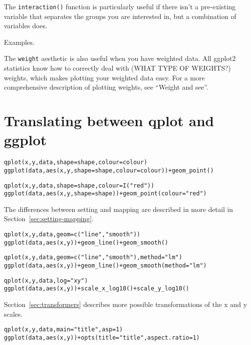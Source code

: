 The {\tt interaction()} function is particularly useful if there isn't a pre-existing variable that separates the groups you are interested in, but a combination of variables does.  

Examples.

The {\tt weight} aesthetic is also useful when you have weighted data.  All ggplot2 statistics know how to correctly deal with (WHAT TYPE OF WEIGHTS?) weights, which makes plotting your weighted data easy.  For a more comprehensive description of plotting weights, see ``Weight and see''.

\section{Translating between qplot and ggplot}
\label{sec:qplot-ggplot}


\begin{alltt}
qplot(x, y, data, shape=shape, colour = colour)
ggplot(data, aes(x, y, shape=shape, colour = colour)) + geom_point()
\end{alltt}

\begin{alltt}
qplot(x, y, data, shape=shape, colour = I("red"))
ggplot(data, aes(x, y, shape=shape)) + geom_point(colour="red")
\end{alltt}

The differences between setting and mapping are described in more detail in Section~\ref{sec:setting-mapping}.

\begin{alltt}
qplot(x, y, data, geom=c("line", "smooth"))
ggplot(data, aes(x, y)) + geom_line() + geom_smooth()
\end{alltt}

\begin{alltt}
qplot(x, y, data, geom=c("line", "smooth"), method="lm")
ggplot(data, aes(x, y)) + geom_line() + geom_smooth(method="lm")
\end{alltt}


\begin{alltt}
qplot(x, y, data, log="xy")
ggplot(data, aes(x, y)) + scale_x_log10() + scale_y_log10()
\end{alltt}

Section~\ref{sec:transformers} describes more possible transformations of the x and y scales.

\begin{alltt}
qplot(x, y, data, main="title", asp = 1)
ggplot(data, aes(x, y)) + opts(title = "title", aspect.ratio = 1)
\end{alltt}

